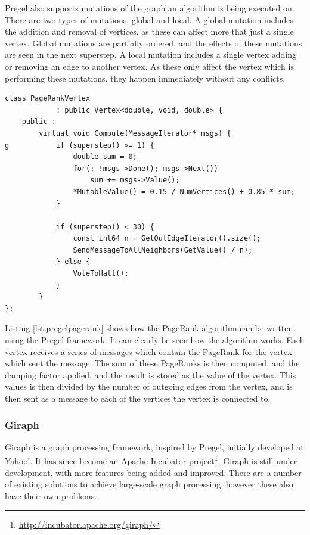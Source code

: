 Pregel also supports mutations of the graph an algorithm is being executed on. There are two types of mutations, global and local. A global mutation includes the addition and removal of vertices, as these can affect more that just a single vertex. Global mutations are partially ordered, and the effects of these mutations are seen in the next superstep. A local mutation includes a single vertex adding or removing an edge to another vertex. As these only affect the vertex which is performing these mutations, they happen immediately without any conflicts.

\begin{lstlisting}[float]
class PageRankVertex
			: public Vertex<double, void, double> {
	public :	
		virtual void Compute(MessageIterator* msgs) {
g			if (superstep() >= 1) {
				double sum = 0;
				for(; !msgs->Done(); msgs->Next())
					sum += msgs->Value();
				*MutableValue() = 0.15 / NumVertices() + 0.85 * sum;
			}
			
			if (superstep() < 30) {
				const int64 n = GetOutEdgeIterator().size();
				SendMessageToAllNeighbors(GetValue() / n);
			} else {
				VoteToHalt();
			}
		}
};					
\end{lstlisting} 

Listing \ref{lst:pregelpagerank} shows how the PageRank algorithm \cite{pagerank} can be written using the Pregel framework. It can clearly be seen how the algorithm works. Each vertex receives a series of messages which contain the PageRank for the vertex which sent the message. The sum of these PageRanks is then computed, and the damping factor applied, and the result is stored as the value of the vertex. This values is then divided by the number of outgoing edges from the vertex, and is then sent as a message to each of the vertices the vertex is connected to.

\subsubsection{Giraph}
\label{sec:res_giraph}
Giraph is a graph processing framework, inspired by Pregel, initially developed at Yahoo!. It has since become an Apache Incubator project\footnote{\url{http://incubator.apache.org/giraph/}}. Giraph is still under development, with more features being added and improved. There are a number of existing solutions to achieve large-scale graph processing, however these also have their own problems.

